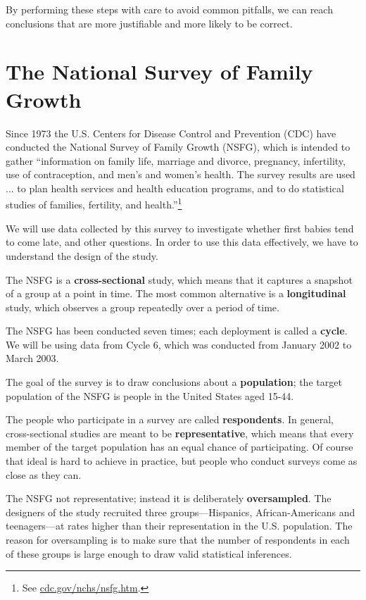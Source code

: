 \documentclass[10pt]{book}
\begin{document}
By performing these steps with care to avoid common pitfalls, we can
reach conclusions that are more justifiable and more likely to be
correct.


\section{The National Survey of Family Growth}

Since 1973 the U.S. Centers for Disease Control and Prevention (CDC)
have conducted the National Survey of Family Growth (NSFG),
which is intended to gather ``information on family life, marriage and
divorce, pregnancy, infertility, use of contraception, and men's and
women's health. The survey results are used ... to plan health services and
health education programs, and to do statistical studies of families,
fertility, and health.''\footnote{See
  \url{cdc.gov/nchs/nsfg.htm}.}

We will use data collected by this survey to investigate whether first
babies tend to come late, and other questions.  In order to use this
data effectively, we have to understand the design of the study.

The NSFG is a {\bf cross-sectional} study, which means that it
captures a snapshot of a group at a point in time.  The most
common alternative is a {\bf longitudinal} study, which observes a
group repeatedly over a period of time.

The NSFG has been conducted seven times; each deployment is called
a {\bf cycle}.  We will be using data from Cycle 6, which was
conducted from January 2002 to March 2003.

The goal of the survey is to draw conclusions about a
{\bf population}; the target population of the NSFG is people in
the United States aged 15-44.

The people who participate in a survey are called {\bf respondents}.
In general, cross-sectional studies are meant to be {\bf
  representative}, which means that every member of the target
population has an equal chance of participating.  Of course that ideal
is hard to achieve in practice, but people who conduct surveys come as
close as they can.

The NSFG not representative; instead it is deliberately {\bf
  oversampled}.  The designers of the study recruited three
groups---Hispanics, African-Americans and teenagers---at rates higher
than their representation in the U.S. population.
The reason for oversampling is to make sure that the number of
respondents in each of these groups is large enough to draw valid
statistical inferences.
\end{document}
